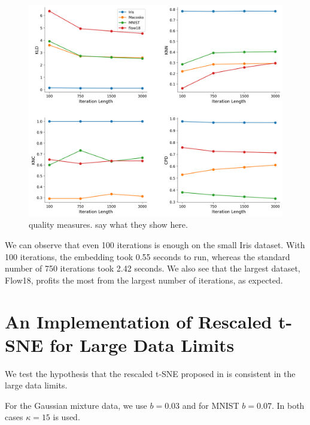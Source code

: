 \begin{figure}[h]
    \centering 
        \includegraphics[width=\linewidth]{figures/n_iter/n_iter_4_quality_measures.png}
        \caption{quality measures. say what they show here.}
    \label{fig:n_iter-quality}
\end{figure}

We can observe that even 100 iterations is enough on the small Iris dataset. 
With 100 iterations, the embedding took 0.55 seconds to run, whereas the standard number of 750 iterations took 2.42 seconds. 
We also see that the largest dataset, Flow18, profits the most from the largest number of iterations, as expected. 

\newpage 
\section{An Implementation of Rescaled t-SNE for Large Data Limits}
We test the hypothesis that the rescaled t-SNE proposed in \cite{murray2024largedatalimitsscaling} is consistent in the large data limits. 

For the Gaussian mixture data, we use $b=0.03$ and for MNIST $b=0.07$. In both cases $\kappa=15$ is used. 

